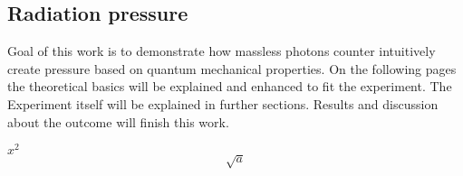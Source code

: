 \documentclass[12pt,a4paper]{article}
\begin{document}

\pagebreak

\setlength{\columnsep}{20pt}
\begin{multicols}{2}

\begin{abstract}

\end{abstract}


%

\section{Radiation pressure}
Goal of this work is to demonstrate how massless photons counter intuitively create pressure based on quantum mechanical
properties.
On the following pages the theoretical basics will be explained and enhanced to fit the experiment. 
The Experiment itself will be explained in further sections. Results and discussion about the outcome
will finish this work.

$x^2$\\

$$\sqrt{a}$$


\end{multicols}
\end{document}
